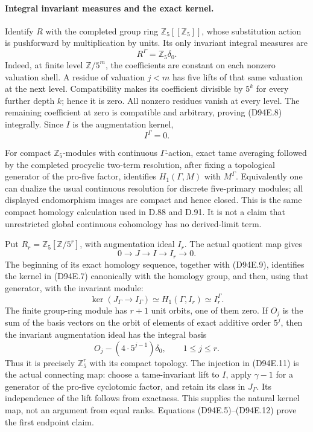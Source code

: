\paragraph{Integral invariant measures and the exact kernel.}
Identify \(R\) with the completed group ring
\(\mathbb Z_5[[\mathbb Z_5]]\), whose substitution action
is pushforward by multiplication by units. Its only invariant
integral measures are
\[
                              R^\Gamma=\mathbb Z_5\delta_0.
                                                        \tag{D94E.8}
\]
Indeed, at finite level \(\mathbb Z/5^m\), the coefficients
are constant on each nonzero valuation shell. A residue of
valuation \(j<m\) has five lifts of that same valuation at
the next level. Compatibility makes its coefficient divisible
by \(5^k\) for every further depth \(k\); hence it is zero.
All nonzero residues vanish at every level. The remaining
coefficient at zero is compatible and arbitrary, proving
(D94E.8) integrally. Since \(I\) is the augmentation kernel,
\[
                                  I^\Gamma=0.           \tag{D94E.9}
\]

For compact \(\mathbb Z_5\)-modules with continuous
\(\Gamma\)-action, exact tame averaging followed by the
completed procyclic two-term resolution, after fixing a
topological generator of the pro-five factor, identifies
\(H_1(\Gamma,M)\) with \(M^\Gamma\). Equivalently one
can dualize the usual continuous resolution for discrete
five-primary modules; all displayed endomorphism images
are compact and hence closed. This is the same compact
homology calculation used in D.88 and D.91. It is not a
claim that unrestricted global continuous cohomology has
no derived-limit term.

Put \(R_r=\mathbb Z_5[\mathbb Z/5^r]\), with augmentation
ideal \(I_r\). The actual quotient map gives
\[
            0\longrightarrow J\longrightarrow I
                      \longrightarrow I_r\longrightarrow0.
                                                        \tag{D94E.10}
\]
The beginning of its exact homology sequence, together with
(D94E.9), identifies the kernel in (D94E.7) canonically with the homology group, and then, using that
generator, with the invariant module:
\[
 \ker(J_\Gamma\to I_\Gamma)
        \simeq H_1(\Gamma,I_r)\simeq I_r^\Gamma.
                                                        \tag{D94E.11}
\]
The finite group-ring module has \(r+1\) unit orbits, one
of them zero. If \(O_j\) is the sum of the basis vectors
on the orbit of elements of exact additive order \(5^j\),
then the invariant augmentation ideal has the integral basis
\[
                O_j-(4\cdot5^{j-1})\delta_0,
                         \qquad 1\le j\le r.            \tag{D94E.12}
\]
Thus it is precisely \(\mathbb Z_5^r\) with its compact
topology. The injection in (D94E.11) is the actual connecting
map: choose a tame-invariant lift to \(I\), apply
\(\gamma-1\) for a generator of the pro-five cyclotomic
factor, and retain its class in \(J_\Gamma\). Its
independence of the lift follows from exactness. This supplies
the natural kernel map, not an argument from equal ranks.
Equations (D94E.5)--(D94E.12) prove the first endpoint claim.

